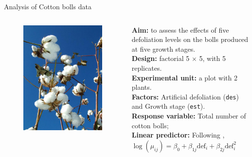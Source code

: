 \documentclass[11pt]{beamer}\usepackage[]{graphicx}\usepackage[]{color}
\begin{document}
\begin{frame}{Analysis of Cotton bolls data}

  \begin{columns}
    \begin{column}{0.4\textwidth}
      \begin{figure}
        \includegraphics[scale=0.25]{./figure2/defoliation}
      \end{figure}
      \vspace{0.2cm}
    \end{column}
    \begin{column}{0.6\textwidth}
      {\bf Aim:} to assess the effects of five defoliation levels on the
      bolls produced at five growth stages.\\[0.2cm]
      {\bf Design:} factorial 5 $\times$ 5, with 5 replicates.\\[0.2cm]
      {\bf Experimental unit:} a plot with 2 plants.\\[0.2cm]
      {\bf Factors:} Artificial defoliation (\texttt{des}) and
      Growth stage (\texttt{est}).\\[0.2cm]
      {\bf Response variable:} Total number of cotton bolls;\\[0.2cm]
      {\bf Linear predictor:} Following \citet{Zeviani2014},
      $\log(\mu_{ij}) = \beta_0 + \beta_{1j} \textrm{def}_i + \beta_{2j}
      \textrm{def}_i^2$
    \end{column}
  \end{columns}
\end{frame}
\end{document}
